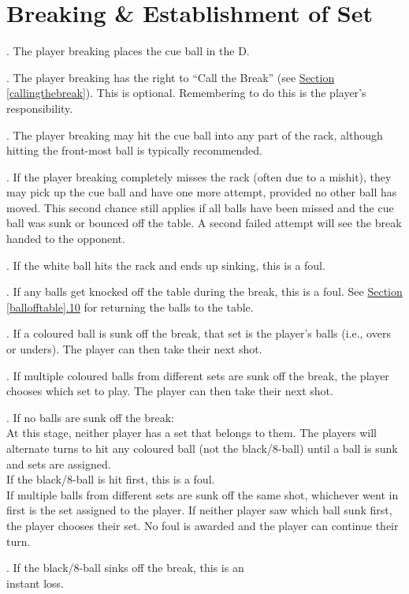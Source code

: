 \documentclass[a4paper, twocolumn]{article}
\newcommand{\fixedlabel}[1]{\textbf{\makebox[3.5em][l]{#1}}}
\newcommand{\itemspace}{\vspace{1.2mm}\\}
\begin{document}
\section{Breaking \& Establishment of Set} \label{breaking}
\ex. The player breaking places the cue ball in the D.\par
\ex. The player breaking has the right to “Call the Break” (see \hyperref[callingthebreak]{Section \ref*{callingthebreak}}). This is optional. Remembering to do this is the player's responsibility.\par
\ex. \label{breakingballs}The player breaking may hit the cue ball into any part of the rack, although hitting the front-most ball is typically recommended.\par
\ex. If the player breaking completely misses the rack (often due to a mishit), they may pick up the cue ball and have one more attempt, provided no other ball has moved. This second chance still applies if all balls have been missed and the cue ball was sunk or bounced off the table. A second failed attempt will see the break handed to the opponent.\par
\ex. If the white ball hits the rack and ends up sinking, this is a foul.\par
\ex. If any balls get knocked off the table during the break, this is a foul. See \hyperref[ballofftable]{Section \ref*{ballofftable}.10} for returning the balls to the table.\par
\ex. If a coloured ball is sunk off the break, that set is the player's balls (i.e., overs or unders). The player can then take their next shot.\par
\ex. If multiple coloured balls from different sets are sunk off the break, the player chooses which set to play. The player can then take their next shot.\par
\ex. \label{breakingnoballs}If no balls are sunk off the break:\itemspace
\fixedlabel{3.9.1}At this stage, neither player has a set that belongs to them. The players will alternate turns to hit any coloured ball (not the black/8-ball) until a ball is sunk and sets are assigned.\itemspace
\fixedlabel{3.9.2}If the black/8-ball is hit first, this is a foul.\itemspace
\fixedlabel{3.9.3}If multiple balls from different sets are sunk off the same shot, whichever went in first is the set assigned to the player. If neither player saw which ball sunk first, the player chooses their set. No foul is awarded and the player can continue their turn.
\par
\ex. \hspace{-2.6mm} If the black/8-ball sinks off the break, this is an \\ \phantom{} \hspace{-2.5mm}instant loss.\par
\end{document}
